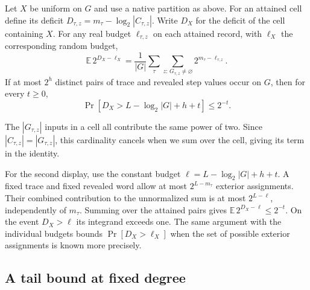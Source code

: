 \begin{proposition}\label{prop:moment}
Let $X$ be uniform on $G$ and use a native partition as above. For an
attained cell define its deficit
$D_{\tau,z}=m_\tau-\log_2|C_{\tau,z}|$. Write $D_X$ for the deficit of
the cell containing $X$. For any real budget $\ell_{\tau,z}$ on each
attained record, with $\ell_X$ the corresponding random budget,
\[
 \mathbb E\,2^{D_X-\ell_X}
   =\frac{1}{|G|}\sum_\tau\sum_{z:\,G_{\tau,z}\ne\varnothing}
                2^{m_\tau-\ell_{\tau,z}} .
\]
If at most $2^h$ distinct pairs of trace and revealed step values occur
on $G$, then for every $t\ge0$,
\[
 \Pr\!\left[D_X>L-\log_2|G|+h+t\right]\le 2^{-t}.
\]
\end{proposition}
\begin{outline}
The $|G_{\tau,z}|$ inputs in a cell all contribute the same power of two.
Since $|C_{\tau,z}|=|G_{\tau,z}|$, this cardinality cancels when we sum
over the cell, giving its term in the identity.

For the second display, use the constant budget
$\ell=L-\log_2|G|+h+t$. A fixed trace and fixed revealed word allow at
most $2^{L-m_\tau}$ exterior assignments. Their combined contribution
to the unnormalized sum is at most $2^{L-\ell}$, independently of
$m_\tau$. Summing over the attained pairs gives
$\mathbb E\,2^{D_X-\ell}\le2^{-t}$. On the event $D_X>\ell$ its
integrand exceeds one. The same argument with the individual budgets
bounds $\Pr[D_X>\ell_X]$ when the set of possible exterior assignments
is known more precisely.
\end{outline}

\subsection{A tail bound at fixed degree}\label{sec:native-rate}

